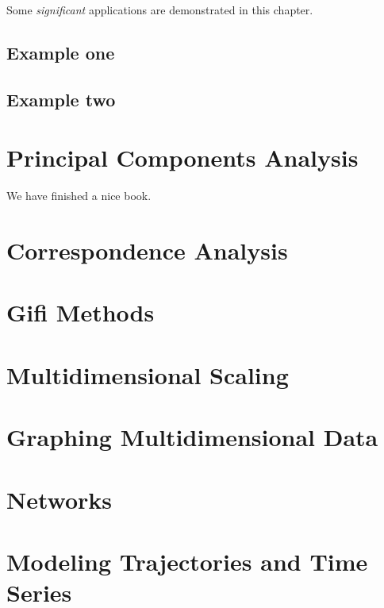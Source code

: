\documentclass[
]{book}
\begin{document}
Some \emph{significant} applications are demonstrated in this chapter.

\hypertarget{example-one}{%
\section{Example one}\label{example-one}}

\hypertarget{example-two}{%
\section{Example two}\label{example-two}}

\hypertarget{principal-components-analysis}{%
\chapter{Principal Components Analysis}\label{principal-components-analysis}}

We have finished a nice book.

\hypertarget{correspondence-analysis}{%
\chapter{Correspondence Analysis}\label{correspondence-analysis}}

\hypertarget{gifi-methods}{%
\chapter{Gifi Methods}\label{gifi-methods}}

\hypertarget{multidimensional-scaling}{%
\chapter{Multidimensional Scaling}\label{multidimensional-scaling}}

\hypertarget{graphing-multidimensional-data}{%
\chapter{Graphing Multidimensional Data}\label{graphing-multidimensional-data}}

\hypertarget{networks}{%
\chapter{Networks}\label{networks}}

\hypertarget{modeling-trajectories-and-time-series}{%
\chapter{Modeling Trajectories and Time Series}\label{modeling-trajectories-and-time-series}}

  
\end{document}

